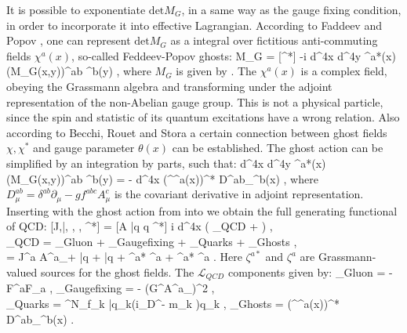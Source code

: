 	It is possible to exponentiate $\text{det} M_G$, in a same way as the gauge fixing condition, in order to incorporate it into effective Lagrangian. According to Faddeev and Popov \cite{Faddeev196729}, one can represent $\text{det} M_G$ as a integral over fictitious anti-commuting fields $\chi^a(x)$, so-called Feddeev-Popov ghosts:
	\beqa
	\label{qcd_low:FP_ghosts}
		 M_G = \int {} [\chi \chi^*]  \;  \left\lbrace -i \int d^4x d^4y \chi^{a*}(x) (M_G(x,y))^{ab} \chi^b(y) \right\rbrace \;,
	\eeqa
where $M_G$ is given by \Eq{\ref{qcd_low:Gauge_matrix}}. The $\chi^a(x)$ is a complex field, obeying the Grassmann algebra and transforming under the adjoint representation of the non-Abelian gauge group. This is not a physical particle, since the spin and statistic of its quantum excitations have a wrong relation. Also according to Becchi, Rouet and Stora \cite{Becchi1976287} a certain connection between ghost fields $\chi, \chi^*$ and gauge parameter $\theta(x)$ can be established. The ghost action can be simplified by an integration by parts, such that:
	\beqa
		\label{qcd_low:FP_ghosts_action}
		\int d^4x d^4y \chi^{a*}(x) (M_G(x,y))^{ab} \chi^b(y) = - \int d^4x (\partial^\mu \chi^a(x))^* D^{ab}_\mu \chi^b(x) \;,
	\eeqa
where $D^{ab}_\mu = \delta^{ab}\partial_\mu - gf^{abc}A^c_\mu$ is the covariant derivative in adjoint representation. Inserting \Eq{\ref{qcd_low:FP_ghosts}} with the ghost action from \Eq{\ref{qcd_low:FP_ghosts_action}} into \Eq{\ref{qcd_low:Gen_functional_vec_fer}} we obtain the full generating functional of QCD:
	\beqa
		\label{qcd_low:Gen_functional_QCD}
		[J,\bar \eta, \eta, \zeta, \zeta^*] = \int {} [A \bar q q \chi \chi^*] \;   \left\lbrace i \int d^4x \left( _{QCD} +  \right)  \right\rbrace \;,\; \\
	\notag	{}_{QCD} = _{Gluon} + _{Gauge\;fixing} + _{Quarks} + _{Ghosts}  \;, \;\;\;\;\;\;\;\;\;\;\; \\
	\notag {} = J^{a\mu} A^a_\mu + \bar q \eta + \bar \eta q + \chi^{a*} \zeta^a + \zeta^{a*} \chi^a \;. \;\;\;\;\;\;\;\;\;\;\;\;\;
	\eeqa
Here $\zeta^{a*}$ and $\zeta^{a}$ are Grassmann-valued sources for the ghost fields. The $\mathcal{L}_{QCD}$ components given by:
	\beqa
		_{Gluon} = - F^{a\mu\nu}F_{a\mu\nu} \;, \;\;\;\;\;\;\;\;\;\;\;\;\;\;\;\;\;\;\;\;\; _{Gauge\;fixing} = - (G^\mu A^a_\mu)^2 \;, \;\; \\
		_{Quarks} = \sum^{N_f}_k \bar{q_k}(i\gamma_\mu D^\mu - m_k )q_k \;, \;\;\;\;\; _{Ghosts} = (\partial^\mu \chi^a(x))^* D^{ab}_\mu \chi^b(x) \;.
	\eeqa

